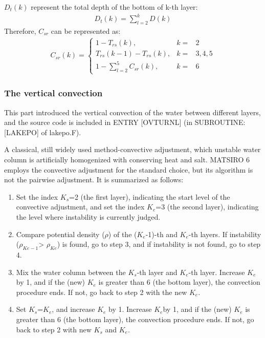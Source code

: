 \(D_{t}(k)\) represent the total depth of the bottom of k-th layer: \begin{eqnarray}
D_{t}(k)=\sum_{l=2}^{k}D(k)
\end{eqnarray} Therefore, \(C_{sr}\) can be represented as: \begin{eqnarray}
C_{sr}(k)=\left\{\begin{matrix}
1-T_{rs}(k), &k=&2\\T_{rs}(k-1)-T_{rs}(k), &k=&3, 4, 5
\\ 1-\sum_{l=2}^{5}C_{sr}(k), &k=&6
\end{matrix}\right.
\end{eqnarray}

\hypertarget{the-vertical-convection}{%
\subsubsection{The vertical convection}\label{the-vertical-convection}}

This part introduced the vertical convection of the water between different layers, and the source code is included in ENTRY {[}OVTURNL{]} (in SUBROUTINE: {[}LAKEPO{]} of lakepo.F).

A classical, still widely used method-convective adjustment, which unstable water column is artificially homogenized with conserving heat and salt. MATSIRO 6 employs the convective adjustment for the
standard choice, but its algorithm is not the pairwise adjustment. It is summarized as follows:

\begin{enumerate}
\def\labelenumi{(\arabic{enumi})}
\item
  Set the index \(K_{s}\)=2 (the first layer), indicating the start level of the convective adjustment, and set the index \(K_{e}\)=3 (the second layer), indicating the level where instability is
  currently judged.
\item
  Compare potential density (\(\rho\)) of the (\(K_{e}\)-1)-th and \(K_{e}\)-th layers. If instability (\(\rho_{Ke-1}\)\textgreater{} \(\rho_{Ke}\)) is found, go to step 3, and if instability is not
  found, go to step 4.
\item
  Mix the water column between the \(K_{s}\)-th layer and \(K_{e}\)-th layer. Increase \(K_{e}\) by 1, and if the (new) \(K_{e}\) is greater than 6 (the bottom layer), the convection procedure ends.
  If not, go back to step 2 with the new \(K_{e}\).
\item
  Set \(K_{s}\)=\(K_{e}\), and increase \(K_{e}\) by 1. Increase \(K_{e}\)by 1, and if the (new) \(K_{e}\) is greater than 6 (the bottom layer), the convection procedure ends. If not, go back to step
  2 with new \(K_{s}\) and \(K_{e}\).
\end{enumerate}

